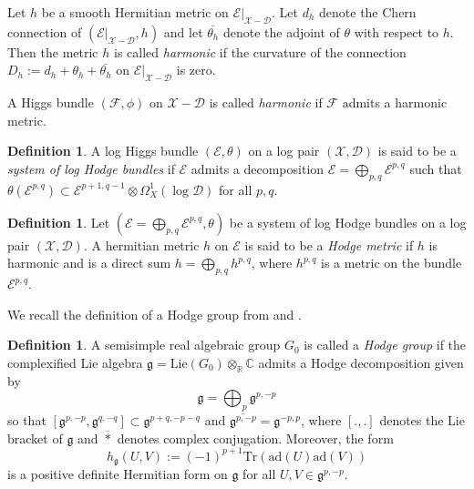 \documentclass[a4paper]{amsart}
\theoremstyle{definition}
\newtheorem{definition}[theorem]{Definition}
\begin{document}
Let $h$ be a smooth Hermitian metric on $\mathcal{E}|_{\mathscr{X}-\mathscr{D}}$. Let $d_h$ denote the Chern connection of $(\mathcal{E}|_{\mathscr{X}-\mathscr{D}},h)$ and let $\overline{\theta_h}$ denote the adjoint of $\theta$ with respect to $h$. Then the metric $h$ is called \emph{harmonic} if the curvature of the connection $D_h:=d_h+\theta_h+\overline{\theta_h}$ on $\mathcal{E}|_{\mathscr{X}-\mathscr{D}}$ is zero.

A Higgs bundle $(\mathcal{F},\phi)$ on $\mathscr{X}-\mathscr{D}$ is called \emph{harmonic} if $\mathcal{F}$ admits a harmonic metric.

\begin{definition}
    A log Higgs bundle $(\mathcal{E},\theta)$ on a log pair $(\mathscr{X},\mathscr{D})$ is said to be a \emph{system of log Hodge bundles} if $\mathcal{E}$ admits a decomposition $\mathcal{E}=\bigoplus_{p,q}\mathcal{E}^{p,q}$ such that $\theta(\mathcal{E}^{p,q})\subset\mathcal{E}^{p+1,q-1}\otimes\Omega^1_X(\log\mathscr{D})$ for all $p,q$.
\end{definition}

\begin{definition}\label{def-Hodge-metric}
    Let $(\mathcal{E}=\bigoplus_{p,q}\mathcal{E}^{p,q},\theta)$ be a system of log Hodge bundles on a log pair $(\mathscr{X},\mathscr{D})$. A hermitian metric $h$ on $\mathcal{E}$ is said to be a \emph{Hodge metric} if $h$ is harmonic and is a direct sum $h=\bigoplus_{p,q}h^{p,q}$, where $h^{p,q}$ is a metric on the bundle $\mathcal{E}^{p,q}$.
\end{definition}

We recall the definition of a Hodge group from \cite[Section 8]{Simpson_unif} and \cite[Section 3]{dengcadorel}. 

\begin{definition}
A semisimple real algebraic group $G_0$ is called a \emph{Hodge group} if the complexified Lie algebra $\mathfrak{g}=\mathrm{Lie}(G_0)\otimes_\mathbb{R}\mathbb{C}$ admits a Hodge decomposition given by 
\[
\mathfrak{g}=\bigoplus_p\mathfrak{g}^{p,-p}
\]
so that $[\mathfrak{g}^{p,-p},\mathfrak{g}^{q,-q}]\subset\mathfrak{g}^{p+q,-p-q}$ and $\overline{\mathfrak{g}^{p,-p}}=\mathfrak{g}^{-p,p}$, where $[.,.]$ denotes the Lie bracket of $\mathfrak{g}$ and $\overline{*}$ denotes complex conjugation. Moreover, the form 
\[
h_{\mathfrak{g}}(U,V):=(-1)^{p+1}\mathrm{Tr}(\mathrm{ad}(U)\mathrm{ad}(V))
\]
is a positive definite Hermitian form on $\mathfrak{g}$ for all $U,V\in\mathfrak{g}^{p,-p}$.
\end{definition}
\end{document}

